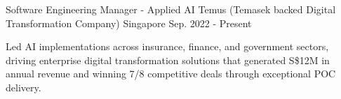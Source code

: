 

\begin{cventries}

  \cventry
    {Software Engineering Manager - Applied AI} %
    {Temus (Temasek backed Digital Transformation Company)} %
    {Singapore} %
    {Sep. 2022 - Present} %
    {
      \begin{cvitems} %
        \item{Led AI implementations across insurance, finance, and government sectors, driving enterprise digital transformation solutions that generated S\$12M in annual revenue and winning 7/8 competitive deals through exceptional POC delivery.}

\end{cvitems}}
\end{cventries}

